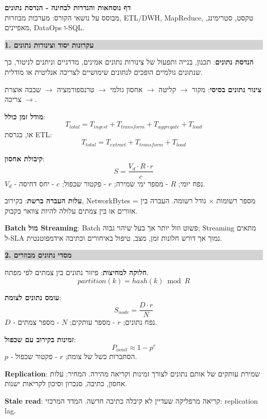 \documentclass[10pt,a4paper]{article}
\newcommand{\eng}[1]{\textenglish{#1}}
\newcommand{\term}[1]{\textbf{#1}}
\newcommand{\formula}[1]{\[
#1
\]}
\newenvironment{cheatbox}[1]{
  \vspace{2pt}
  \noindent\colorbox{lightgray}{\parbox{\dimexpr\linewidth-2\fboxsep}{\textbf{\color{sectionblue}#1}}}
  \vspace{2pt}
}{\vspace{3pt}}
\begin{document}
\begin{center}
{\Large \textbf{דף נוסחאות והגדרות לבחינה - הנדסת נתונים}}\\
{\small מבוסס על נושאי הקורס: מערכות מבוזרות, \eng{ETL/DWH}, \eng{MapReduce}, טקסט, סטרימינג, מאפיינים, \eng{DataOps} ו-\eng{SQL}.}
\end{center}

\begin{multicols}{2}

\begin{cheatbox}{1. עקרונות יסוד וצינורות נתונים}
\term{הנדסת נתונים}: תכנון, בנייה ותפעול של צינורות נתונים אמינים, מדרגיים וניתנים לניטור, כך שנתונים גולמיים הופכים לנתונים שימושיים לצריכה אנליטית או מודלית.

\term{צינור נתונים בסיסי}: מקור $\rightarrow$ קליטה $\rightarrow$ אחסון גולמי $\rightarrow$ טרנספורמציה $\rightarrow$ שכבה אוצרת $\rightarrow$ צריכה.

\term{מודל זמן כולל}:
\formula{T_{total}=T_{ingest}+T_{transform}+T_{aggregate}+T_{load}}
או, בגרסת \eng{ETL}:
\formula{T_{total}=T_{extract}+T_{transform}+T_{load}}

\term{קיבולת אחסון}:
\formula{S=\frac{V_d \cdot R \cdot r}{c}}
$V_d$ - נפח יומי; $R$ - מספר ימי שמירה; $r$ - פקטור שכפול; $c$ - יחס דחיסה.

\term{עלות העברה ברשת}: בקירוב, \eng{NetworkBytes} = מספר רשומות $\times$ גודל רשומה. העברה בין אזורים או בין צמתים עלולה להיות צוואר בקבוק.

\term{\eng{Batch} מול \eng{Streaming}}: \eng{Batch} פשוט וזול יותר אך בעל שיהוי גבוה; \eng{Streaming} מתאים ל-\eng{SLA} נמוך אך דורש חלונות זמן, מצב, טיפול באיחורים וכתיבה אידמפוטנטית.
\end{cheatbox}

\begin{cheatbox}{2. מסדי נתונים מבוזרים}
\term{חלוקה למחיצות}: פיזור נתונים בין צמתים לפי מפתח.
\formula{partition(k)=hash(k)\bmod R}

\term{עומס נתונים לצומת}:
\formula{S_{node}=\frac{D\cdot r}{N}}
$D$ - נפח נתונים; $r$ - מספר עותקים; $N$ - מספר צמתים.

\term{זמינות בקירוב עם שכפול}:
\formula{P_{avail}\approx 1-p^r}
$p$ - הסתברות כשל של צומת; $r$ - פקטור שכפול.

\term{\eng{Replication}}: שמירת עותקים של אותם נתונים לצורך זמינות וקריאה מהירה. המחיר: עלות אחסון, כתיבה, סנכרון וסיכון לקריאות ישנות.

\term{\eng{Stale read}}: קריאה מרפליקה שעדיין לא קיבלה כתיבה חדשה. המדד המרכזי: \eng{replication lag}.


\end{cheatbox}
\end{multicols}
\end{document}

